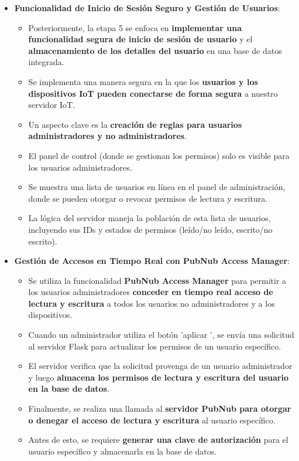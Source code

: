 \documentclass{report}
\begin{document}
\begin{itemize}
    \item \textbf{Funcionalidad de Inicio de Sesión Seguro y Gestión de Usuarios}:
    \begin{itemize}
        \item Posteriormente, la etapa 5 se enfoca en \textbf{implementar una funcionalidad segura de inicio de sesión de usuario} y el 
        \textbf{almacenamiento de los detalles del usuario} en una base de datos integrada.
        \item Se implementa una manera segura en la que los \textbf{usuarios y los dispositivos IoT pueden conectarse de forma segura} a nuestro 
        servidor IoT.
        \item Un aspecto clave es la \textbf{creación de reglas para usuarios administradores y no administradores}.
        \item El panel de control (donde se gestionan los permisos) solo es visible para los usuarios administradores.
        \item Se muestra una lista de usuarios en línea en el panel de administración, donde se pueden otorgar o revocar permisos de lectura y escritura.
        \item La lógica del servidor maneja la población de esta lista de usuarios, incluyendo sus IDs y estados de permisos (leído/no leído, 
        escrito/no escrito).
    \end{itemize}
    \item \textbf{Gestión de Accesos en Tiempo Real con PubNub Access Manager}:
    \begin{itemize}
        \item Se utiliza la funcionalidad \textbf{PubNub Access Manager} para permitir a los usuarios administradores \textbf{conceder en tiempo real acceso 
        de lectura y escritura} a todos los usuarios no administradores y a los dispositivos.
        \item Cuando un administrador utiliza el botón  'aplicar ', se envía una solicitud al servidor Flask para actualizar los permisos de un usuario 
        específico.
        \item El servidor verifica que la solicitud provenga de un usuario administrador y luego \textbf{almacena los permisos de lectura y escritura del 
        usuario en la base de datos}.
        \item Finalmente, se realiza una llamada al \textbf{servidor PubNub para otorgar o denegar el acceso de lectura y escritura} al usuario específico.
        \item Antes de esto, se requiere \textbf{generar una clave de autorización} para el usuario específico y almacenarla en la base de datos.
    \end{itemize}
\end{itemize}
\end{document}
